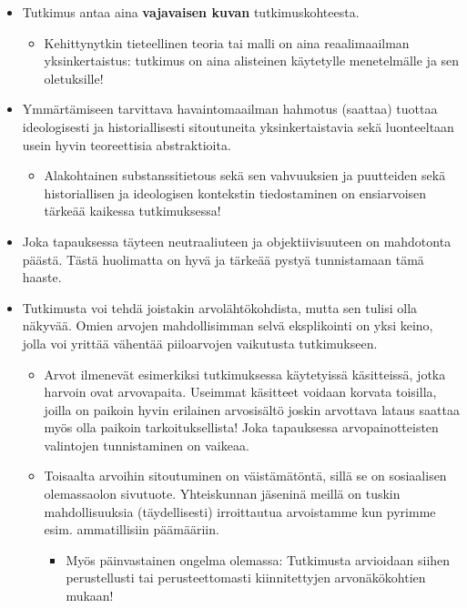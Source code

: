 \documentclass[
]{book}
\providecommand{\tightlist}{%
  \setlength{\itemsep}{0pt}\setlength{\parskip}{0pt}}
\begin{document}
\begin{itemize}
  \begin{itemize}
  \tightlist
  \item
    Tutkimus antaa aina \textbf{vajavaisen kuvan} tutkimuskohteesta.

    \begin{itemize}
    \tightlist
    \item
      Kehittynytkin tieteellinen teoria tai malli on aina reaalimaailman yksinkertaistus: tutkimus on aina alisteinen käytetylle menetelmälle ja sen oletuksille!
    \end{itemize}
  \item
    Ymmärtämiseen tarvittava havaintomaailman hahmotus (saattaa) tuottaa ideologisesti ja historiallisesti sitoutuneita yksinkertaistavia sekä luonteeltaan usein hyvin teoreettisia abstraktioita.

    \begin{itemize}
    \tightlist
    \item
      Alakohtainen substanssitietous sekä sen vahvuuksien ja puutteiden sekä historiallisen ja ideologisen kontekstin tiedostaminen on ensiarvoisen tärkeää kaikessa tutkimuksessa!
    \end{itemize}
  \item
    Joka tapauksessa täyteen neutraaliuteen ja objektiivisuuteen on mahdotonta päästä. Tästä huolimatta on hyvä ja tärkeää pystyä tunnistamaan tämä haaste.
  \item
    Tutkimusta voi tehdä joistakin arvolähtökohdista, mutta sen tulisi olla näkyvää. Omien arvojen mahdollisimman selvä eksplikointi on yksi keino, jolla voi yrittää vähentää piiloarvojen vaikutusta tutkimukseen.

    \begin{itemize}
    \tightlist
    \item
      Arvot ilmenevät esimerkiksi tutkimuksessa käytetyissä käsitteissä, jotka harvoin ovat arvovapaita. Useimmat käsitteet voidaan korvata toisilla, joilla on paikoin hyvin erilainen arvosisältö joskin arvottava lataus saattaa myös olla paikoin tarkoituksellista! Joka tapauksessa arvopainotteisten valintojen tunnistaminen on vaikeaa.
    \item
      Toisaalta arvoihin sitoutuminen on väistämätöntä, sillä se on sosiaalisen olemassaolon sivutuote. Yhteiskunnan jäseninä meillä on tuskin mahdollisuuksia (täydellisesti) irroittautua arvoistamme kun pyrimme esim. ammatillisiin päämääriin.

      \begin{itemize}
      \tightlist
      \item
        Myös päinvastainen ongelma olemassa: Tutkimusta arvioidaan siihen perustellusti tai perusteettomasti kiinnitettyjen arvonäkökohtien mukaan!
      \end{itemize}
    \end{itemize}
  \end{itemize}
\end{itemize}
\end{document}
